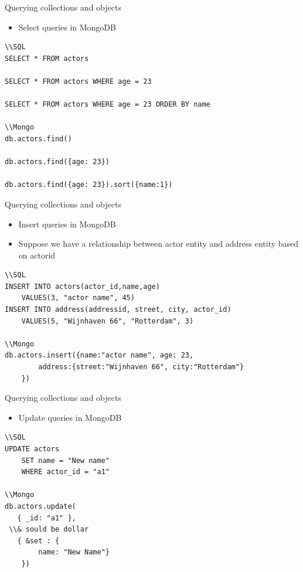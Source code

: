 \documentclass{beamer}
\begin{document}
\begin{frame}[fragile]{Querying collections and objects}
\begin{itemize}
\item Select queries in MongoDB 
\end{itemize}
\begin{lstlisting}
\\SQL
SELECT * FROM actors

SELECT * FROM actors WHERE age = 23 

SELECT * FROM actors WHERE age = 23 ORDER BY name

\\Mongo
db.actors.find()

db.actors.find({age: 23})

db.actors.find({age: 23}).sort({name:1})
\end{lstlisting}
\end{frame}


\begin{frame}[fragile]{Querying collections and objects}
\begin{itemize}
\item Insert queries in MongoDB 
\item Suppose we have a relationship between actor entity and address entity based on actor\textunderscore id
\end{itemize}
\begin{lstlisting}
\\SQL
INSERT INTO actors(actor_id,name,age) 
	VALUES(3, "actor name", 45)
INSERT INTO address(addressid, street, city, actor_id) 
	VALUES(5, "Wijnhaven 66", "Rotterdam", 3)

\\Mongo
db.actors.insert({name:"actor name", age: 23, 
		address:{street:"Wijnhaven 66", city:"Rotterdam"}
	})
\end{lstlisting}
\end{frame}

\begin{frame}[fragile]{Querying collections and objects}
\begin{itemize}
\item Update queries in MongoDB 
\end{itemize}
\begin{lstlisting}
\\SQL
UPDATE actors
	SET name = "New name" 
	WHERE actor_id = "a1"

\\Mongo
db.actors.update(
   { _id: "a1" },
 \\& sould be dollar
   { &set : {
   		name: "New Name"} 
   	})
\end{lstlisting}
\end{frame}
\end{document}
